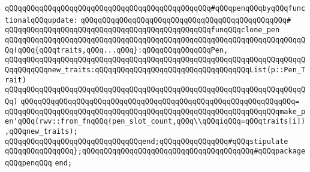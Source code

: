 \verb|qQQqqQQqqQQqqQQqqQQqqQQqqQQqqQQqqQQqqQQqqQQqqQQq#qQQqpenqQQqbyqQQqfunctionalqQQqupdate:|\newline
\verb|qQQqqQQqqQQqqQQqqQQqqQQqqQQqqQQqqQQqqQQqqQQqqQQq#|\newline
\verb|qQQqqQQqqQQqqQQqqQQqqQQqqQQqqQQqqQQqqQQqqQQqqQQqfunqQQqclone_pen|\newline
\verb|qQQqqQQqqQQqqQQqqQQqqQQqqQQqqQQqqQQqqQQqqQQqqQQqqQQqqQQqqQQqqQQqqQQqqQQq(qQQq{qQQqtraits,qQQq...qQQq}:qQQqqQQqqQQqqQQqPen,|\newline
\verb|qQQqqQQqqQQqqQQqqQQqqQQqqQQqqQQqqQQqqQQqqQQqqQQqqQQqqQQqqQQqqQQqqQQqqQQqqQQqqQQqnew_traits:qQQqqQQqqQQqqQQqqQQqqQQqqQQqqQQqqQQqList(p::Pen_Trait)|\newline
\verb|qQQqqQQqqQQqqQQqqQQqqQQqqQQqqQQqqQQqqQQqqQQqqQQqqQQqqQQqqQQqqQQqqQQqqQQq)|\newline
\verb|qQQqqQQqqQQqqQQqqQQqqQQqqQQqqQQqqQQqqQQqqQQqqQQqqQQqqQQqqQQqqQQq=|\newline
\verb|qQQqqQQqqQQqqQQqqQQqqQQqqQQqqQQqqQQqqQQqqQQqqQQqqQQqqQQqqQQqqQQqmake_pen'qQQq(rwv::from_fnqQQq(pen_slot_count,qQQq\\qQQqiqQQq=qQQqtraits[i]),qQQqnew_traits);|\newline
\newline
\verb|qQQqqQQqqQQqqQQqqQQqqQQqqQQqqQQqend;qQQqqQQqqQQqqQQq#qQQqstipulate|\newline
\verb|qQQqqQQqqQQqqQQq};qQQqqQQqqQQqqQQqqQQqqQQqqQQqqQQqqQQqqQQq#qQQqpackageqQQqpenqQQq|\newline
\newline
\verb|end;|\newline
\newline

